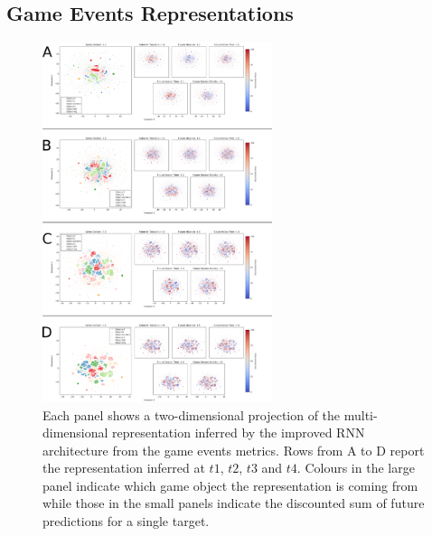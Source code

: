 \subsection{Game Events Representations}
\begin{figure}[!htb]
\includegraphics[width=0.6\textwidth]{images/appendix_D/rnn_full_even_umap.png}
\centering
\caption[\textbf{Lower dimensional representation of the latent representations generated by the improved RNN architecture from the game events metrics}]{Each panel shows a two-dimensional projection of the multi-dimensional representation inferred by the improved RNN architecture from the game events metrics. Rows from A to D report the representation inferred at $t1$, $t2$, $t3$ and $t4$. Colours in the large panel indicate which game object the representation is coming from while those in the small panels indicate the discounted sum of future predictions for a single target.}
\end{figure}
\FloatBarrier

